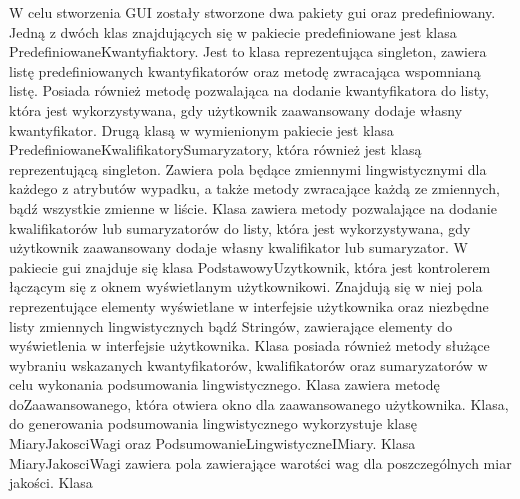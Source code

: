 \documentclass{classrep}
\begin{document}
W celu stworzenia GUI zostały stworzone dwa pakiety gui oraz predefiniowany. Jedną z dwóch klas znajdujących się w pakiecie predefiniowane jest klasa PredefiniowaneKwantyfiaktory. Jest to klasa reprezentująca singleton, zawiera listę predefiniowanych kwantyfikatorów oraz metodę zwracająca wspomnianą listę. Posiada również metodę pozwalająca na dodanie kwantyfikatora do listy, która jest wykorzystywana, gdy użytkownik zaawansowany dodaje własny kwantyfikator. Drugą klasą w wymienionym pakiecie jest klasa PredefiniowaneKwalifikatorySumaryzatory, która również jest klasą reprezentującą singleton. Zawiera pola będące zmiennymi lingwistycznymi dla każdego z atrybutów wypadku, a także metody zwracające każdą ze zmiennych, bądź wszystkie zmienne w liście. Klasa zawiera metody pozwalające na dodanie kwalifikatorów lub sumaryzatorów do listy, która jest wykorzystywana, gdy użytkownik zaawansowany dodaje własny kwalifikator lub sumaryzator. W pakiecie gui znajduje się klasa PodstawowyUzytkownik, która jest kontrolerem łączącym się z oknem wyświetlanym użytkownikowi. Znajdują się w niej pola reprezentujące elementy wyświetlane w interfejsie użytkownika oraz niezbędne listy zmiennych lingwistycznych bądź Stringów, zawierające elementy do wyświetlenia w interfejsie użytkownika. Klasa posiada również metody służące wybraniu wskazanych kwantyfikatorów, kwalifikatorów oraz sumaryzatorów w celu wykonania podsumowania lingwistycznego. Klasa zawiera metodę doZaawansowanego, która otwiera okno dla zaawansowanego użytkownika. Klasa, do generowania podsumowania lingwistycznego wykorzystuje klasę MiaryJakosciWagi oraz PodsumowanieLingwistyczneIMiary. Klasa MiaryJakosciWagi zawiera pola zawierające warotści wag dla poszczególnych miar jakości. Klasa
\end{document}
